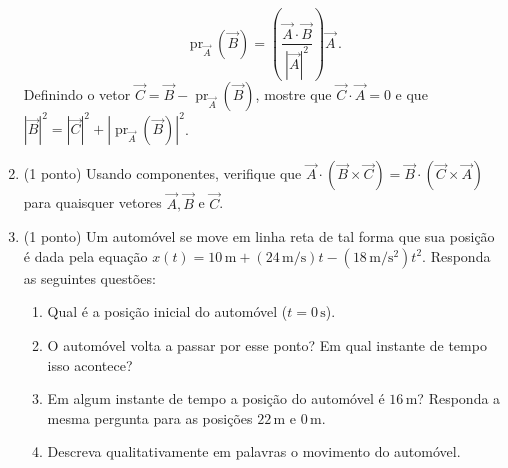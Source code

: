 \documentclass[12pt,a4paper]{article}
\newcommand{\dpar}[1]{\left(#1\right)}
\newcommand{\un}[1]{\mathrm{#1}}
\DeclareMathOperator{\pr}{pr}
\begin{document}
\begin{enumerate}
	$$\pr_{\vec A}(\vec B)=\dpar{\frac{\vec A\cdot \vec B}{|\vec A|^2}}\vec A\,.$$
	Definindo o vetor $\vec C=\vec B-\pr_{\vec A}(\vec B)$, mostre que $\vec C\cdot\vec A=0$ e que $|\vec B|^2=|\vec C|^2+|\pr_{\vec A}(\vec B)|^2$.
	\item (1 ponto) Usando componentes, verifique que $\vec A\cdot(\vec B\times\vec C)=\vec B\cdot(\vec C\times \vec A)$ para quaisquer vetores $\vec A, \vec B$ e $\vec C$.
	\item (1 ponto) Um automóvel se move em linha reta de tal forma que sua posição é dada pela equação $x(t)=10\,\un{m}+(24\,\un{m}/\un{s})t-(18\,\un{m}/\un{s^2})t^2$. Responda as seguintes questões:
	\begin{enumerate}
		\item Qual é a posição inicial do automóvel ($t=0\,\un{s}$).
		\item O automóvel volta a passar por esse ponto? Em qual instante de tempo isso acontece?
		\item Em algum instante de tempo a posição do automóvel é $16\,\un{m}$? Res\-pon\-da a mesma pergunta para as posições $22\,\un{m}$ e $0\,\un{m}$.
		\item Descreva qualitativamente em palavras o movimento do automóvel.
	\end{enumerate}
\end{enumerate}
\end{document}
